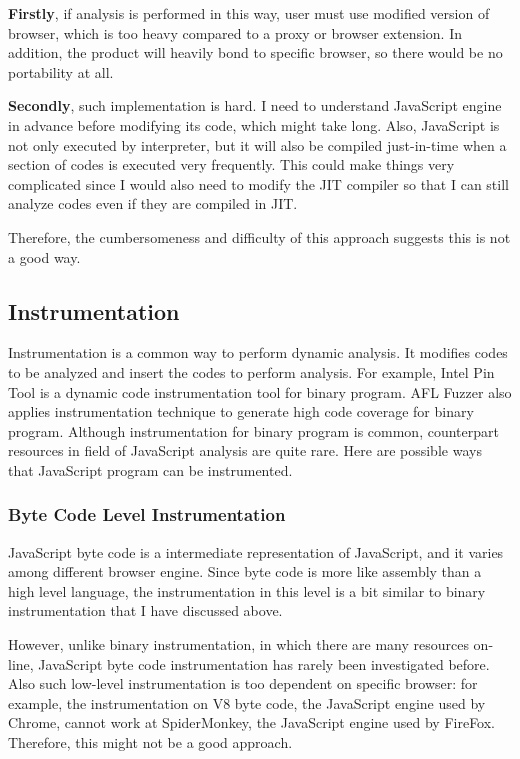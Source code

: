 \textbf{Firstly}, if analysis is performed in this way, user must use modified version of browser, which is too heavy compared to a  proxy or browser extension. In addition, the product will heavily bond to specific browser, so there would be no portability at all.

\textbf{Secondly}, such implementation is hard. I need to understand JavaScript engine in advance before modifying its code, which might take long. Also, JavaScript is not only executed by interpreter, but it will also be compiled just-in-time when a section of codes is executed very frequently. This could make things very complicated since I would also need to modify the JIT compiler so that I can still analyze codes even if they are compiled in JIT.

Therefore, the cumbersomeness and difficulty of this approach suggests this is not a good way.

\subsection{Instrumentation}

Instrumentation is a common way to perform dynamic analysis. It modifies codes to be analyzed and insert the codes to perform analysis. For example, Intel Pin Tool \citep{pintool} is a dynamic code instrumentation tool for binary program. AFL Fuzzer \citep{aflfuzzer} also applies instrumentation technique to generate high code coverage for binary program. Although instrumentation for binary program is common, counterpart resources in field of JavaScript analysis are quite rare. Here are possible ways that JavaScript program can be instrumented.

\subsubsection{Byte Code Level Instrumentation}

JavaScript byte code is a intermediate representation of JavaScript, and it varies among different browser engine. Since byte code is more like assembly than a high level language, the instrumentation in this level is a bit similar to binary instrumentation that I have discussed above. 

However, unlike binary instrumentation, in which there are many resources on-line, JavaScript byte code instrumentation has rarely been investigated before. Also such low-level instrumentation is too dependent on specific browser: for example, the instrumentation on V8 byte code, the JavaScript engine used by Chrome, cannot work at SpiderMonkey,  the JavaScript engine used by FireFox. Therefore, this might not be a good approach. 


